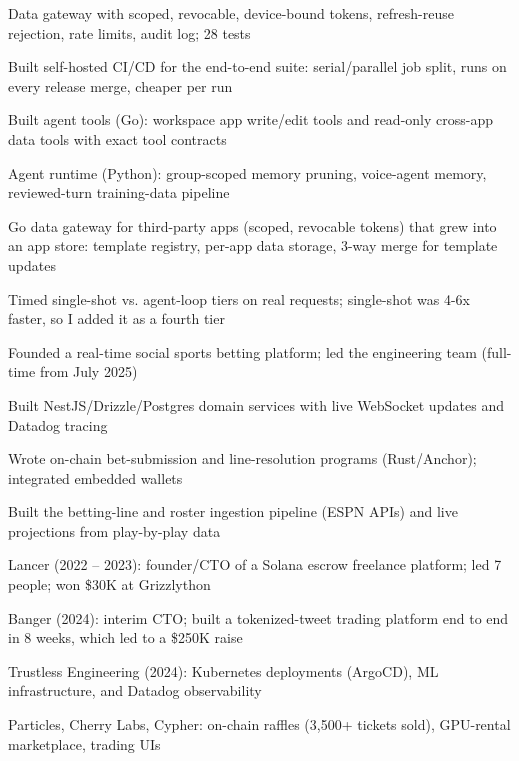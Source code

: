 \documentclass[print]{jack-resume}
\begin{document}
\begin{tightemize}
    \item Data gateway with scoped, revocable, device-bound tokens, refresh-reuse rejection, rate limits, audit log; 28 tests
    \item Built self-hosted CI/CD for the end-to-end suite: serial/parallel job split, runs on every release merge, cheaper per run
    \item Built agent tools (Go): workspace app write/edit tools and read-only cross-app data tools with exact tool contracts
    \item Agent runtime (Python): group-scoped memory pruning, voice-agent memory, reviewed-turn training-data pipeline
    \item Go data gateway for third-party apps (scoped, revocable tokens) that grew into an app store: template registry, per-app data storage, 3-way merge for template updates
    \item Timed single-shot vs. agent-loop tiers on real requests; single-shot was 4-6x faster, so I added it as a fourth tier
\end{tightemize}
\sectionsep

\begin{tightemize}
    \item Founded a real-time social sports betting platform; led the engineering team (full-time from July 2025)
    \item Built NestJS/Drizzle/Postgres domain services with live WebSocket updates and Datadog tracing
    \item Wrote on-chain bet-submission and line-resolution programs (Rust/Anchor); integrated embedded wallets
    \item Built the betting-line and roster ingestion pipeline (ESPN APIs) and live projections from play-by-play data
\end{tightemize}
\sectionsep

\begin{tightemize}
    \item Lancer (2022 – 2023): founder/CTO of a Solana escrow freelance platform; led 7 people; won \$30K at Grizzlython
    \item Banger (2024): interim CTO; built a tokenized-tweet trading platform end to end in 8 weeks, which led to a \$250K raise
    \item Trustless Engineering (2024): Kubernetes deployments (ArgoCD), ML infrastructure, and Datadog observability
    \item Particles, Cherry Labs, Cypher: on-chain raffles (3,500+ tickets sold), GPU-rental marketplace, trading UIs
\end{tightemize}
\sectionsep
\end{document}
